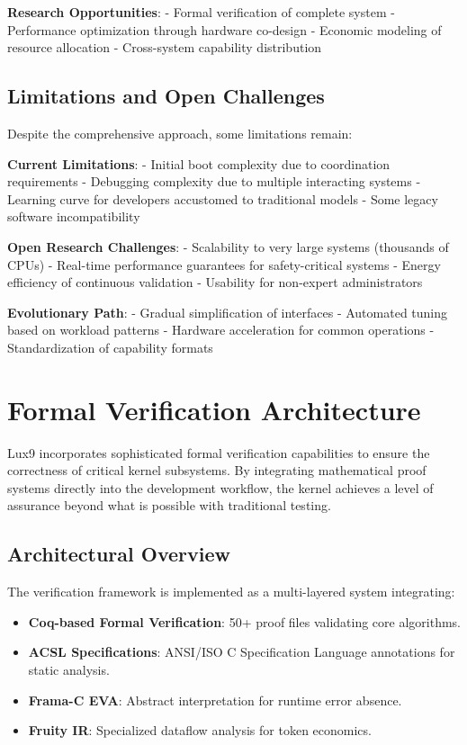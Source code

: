 \documentclass[11pt,letterpaper]{article}
\begin{document}
\textbf{Research Opportunities}:
- Formal verification of complete system
- Performance optimization through hardware co-design
- Economic modeling of resource allocation
- Cross-system capability distribution

\subsection{Limitations and Open Challenges}

Despite the comprehensive approach, some limitations remain:

\textbf{Current Limitations}:
- Initial boot complexity due to coordination requirements
- Debugging complexity due to multiple interacting systems
- Learning curve for developers accustomed to traditional models
- Some legacy software incompatibility

\textbf{Open Research Challenges}:
- Scalability to very large systems (thousands of CPUs)
- Real-time performance guarantees for safety-critical systems
- Energy efficiency of continuous validation
- Usability for non-expert administrators

\textbf{Evolutionary Path}:
- Gradual simplification of interfaces
- Automated tuning based on workload patterns
- Hardware acceleration for common operations
- Standardization of capability formats

\section{Formal Verification Architecture}

Lux9 incorporates sophisticated formal verification capabilities to ensure the correctness of critical kernel subsystems. By integrating mathematical proof systems directly into the development workflow, the kernel achieves a level of assurance beyond what is possible with traditional testing.

\subsection{Architectural Overview}

The verification framework is implemented as a multi-layered system integrating:
\begin{itemize}
\item \textbf{Coq-based Formal Verification}: 50+ proof files validating core algorithms.
\item \textbf{ACSL Specifications}: ANSI/ISO C Specification Language annotations for static analysis.
\item \textbf{Frama-C EVA}: Abstract interpretation for runtime error absence.
\item \textbf{Fruity IR}: Specialized dataflow analysis for token economics.
\end{itemize}
\end{document}

